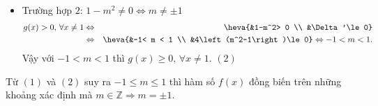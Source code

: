 \begin{ex}
{\begin{itemchoice}
\begin{itemize}
                \begin{itemize}
                    \item Với $m=1\Rightarrow g(1)=4> 0;$
                    \item Với $m=-1\Rightarrow g\left(-1\right)=4> 0$;
                \end{itemize}	
                Vậy với $m=\pm 1$ thì $g(x)\ge 0,\,\forall x\ne 1$. $(1)$
                \item Trường hợp $2$: $1-m^2\ne 0\Leftrightarrow m\ne \pm 1$
                \begin{eqnarray*}
                    g(x) > 0,\,\forall x\ne 1 &\Leftrightarrow& \heva{&1-m^2> 0 \\ &\Delta '\le 0} \\
                    & \Leftrightarrow& \heva{&-1< m < 1 \\ &4\left(m^2-1\right)\le 0} \Leftrightarrow-1< m < 1.
                \end{eqnarray*}
                Vậy với $-1< m < 1$ thì $g(x)\ge 0,\,\forall x\ne 1$. $(2)$
            \end{itemize}
            Từ $(1)$ và $(2)$ suy ra $-1\le m\le 1$ thì hàm số $f(x)$ đồng biến trên những khoảng xác định mà $m\in \mathbb{Z}\Rightarrow m=\pm 1$.
        \end{itemchoice}
    }
\end{ex}
